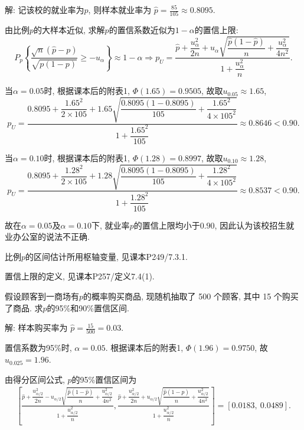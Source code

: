 \documentclass[standard]{ExBook}
\renewenvironment{shaded}{%
  \def\FrameCommand{\fboxsep=\FrameSep \colorbox{shadecolor}}%
  \MakeFramed{\advance\hsize-\width \FrameRestore}%
}{%
  \endMakeFramed
}
\begin{document}
\begin{qitems}
\vspace{\dimexpr2.5cm-5em\relax}

解: 记该校的就业率为$p$, 则样本就业率为
$
\widehat{p}=\frac{85}{105}\approx0.8095.
$

由比例$p$的大样本近似, 求解$p$的置信系数近似为$1-\alpha$的置信上限:
$$
P_p\left\{
\frac{\sqrt{n}(\widehat{p}-p)}
{\sqrt{p(1-p)}}
\geq-u_{\alpha}
\right\}
\approx1-\alpha
\Longrightarrow
p_U
=
\frac{\widehat{p}+\dfrac{u_{\alpha}^2}{2n}
+u_{\alpha}\sqrt{\dfrac{\widehat{p}(1-\widehat{p})}{n}
+\dfrac{u_{\alpha}^2}{4n^2}}}
{1+\dfrac{u_{\alpha}^2}{n}}.
$$

当$\alpha=0.05$时, 根据课本后的附表1, $\Phi(1.65)=0.9505$, 故取$u_{0.05}\approx1.65$,
$$
p_U
=
\frac{0.8095+\dfrac{1.65^2}{2\times105}
+1.65\sqrt{\dfrac{0.8095(1-0.8095)}{105}
+\dfrac{1.65^2}{4\times105^2}}}
{1+\dfrac{1.65^2}{105}}
\approx0.8646<0.90.
$$

当$\alpha=0.10$时, 根据课本后的附表1, $\Phi(1.28)=0.8997$, 故取$u_{0.10}\approx1.28$,
$$
p_U
=
\frac{0.8095+\dfrac{1.28^2}{2\times105}
+1.28\sqrt{\dfrac{0.8095(1-0.8095)}{105}
+\dfrac{1.28^2}{4\times105^2}}}
{1+\dfrac{1.28^2}{105}}
\approx0.8537<0.90.
$$

故在$\alpha=0.05$及$\alpha=0.10$下, 就业率$p$的置信上限均小于$0.90$, 因此认为该校招生就业办公室的说法不正确.

\textcolor{themeColor}{\selectfont {}
比例$p$的区间估计所用枢轴变量, 见课本P249/7.3.1.}

\textcolor{themeColor}{\selectfont {}
置信上限的定义, 见课本P257/定义7.4(1).}

\vspace{2.5cm-5em}

    \begin{bbox}
    \begin{shaded}
        \qitem
假设顾客到一商场有$p$的概率购买商品, 现随机抽取了 500 个顾客, 其中 15 个购买了商品. 求$p$的95\%和90\%置信区间.
    \end{shaded}
    \end{bbox}

\vspace{\dimexpr2.5cm-5em\relax}

解: 样本购买率为
$
\widehat{p}=\frac{15}{500}=0.03.
$

置信系数为95\%时, $\alpha=0.05$. 根据课本后的附表1, $\Phi(1.96)=0.9750$, 故$u_{0.025}=1.96$.

由得分区间公式, $p$的95\%置信区间为
$$
\begin{aligned}
\left[
\frac{\widehat{p}+\dfrac{u_{\alpha/2}^2}{2n}
-u_{\alpha/2}\sqrt{\dfrac{\widehat{p}(1-\widehat{p})}{n}
+\dfrac{u_{\alpha/2}^2}{4n^2}}}
{1+\dfrac{u_{\alpha/2}^2}{n}},
\frac{\widehat{p}+\dfrac{u_{\alpha/2}^2}{2n}
+u_{\alpha/2}\sqrt{\dfrac{\widehat{p}(1-\widehat{p})}{n}
+\dfrac{u_{\alpha/2}^2}{4n^2}}}
{1+\dfrac{u_{\alpha/2}^2}{n}}
\right]
=
[0.0183,\ 0.0489].
\end{aligned}
$$


\end{qitems}
\end{document}
